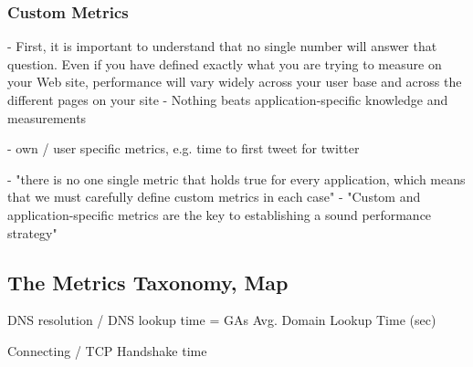 \subsubsection{Custom Metrics}


- First, it is important to understand that no single number will answer that question. Even if you have defined exactly what you are trying to measure on your Web site, performance will vary widely across your user base and across the different pages on your site
- Nothing beats application-specific knowledge and measurements

- own / user specific metrics, e.g. time to first tweet for twitter 


- "there is no one single metric that holds true for every application, which means that we must carefully define custom metrics in each case"
-  "Custom and application-specific metrics are the key to establishing a sound performance strategy"











\subsection{The Metrics Taxonomy, Map}

















DNS resolution / DNS lookup time %
= GAs Avg. Domain Lookup Time (sec) %


Connecting / TCP Handshake time %


